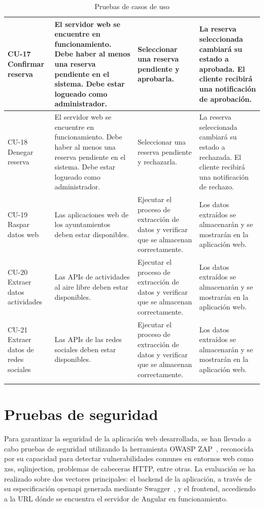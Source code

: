 \begin{longtable}{|p{2.5cm}|p{3.5cm}|p{4.5cm}|p{5cm}|}
CU-17 Confirmar reserva &
El servidor web se encuentre en funcionamiento. \newline Debe haber al menos una reserva pendiente en el sistema. Debe estar logueado como administrador. &
Seleccionar una reserva pendiente y aprobarla. &
La reserva seleccionada cambiará su estado a aprobada. \newline El cliente recibirá una notificación de aprobación. \\ \hline

CU-18 Denegar reserva &
El servidor web se encuentre en funcionamiento. \newline Debe haber al menos una reserva pendiente en el sistema. Debe estar logueado como administrador. &
Seleccionar una reserva pendiente y rechazarla. &
La reserva seleccionada cambiará su estado a rechazada. \newline El cliente recibirá una notificación de rechazo. \\ \hline

CU-19 Raspar datos web &
Las aplicaciones web de los ayuntamientos deben estar disponibles. &
Ejecutar el proceso de extracción de datos y verificar que se almacenan correctamente. &
Los datos extraídos se almacenarán y se mostrarán en la aplicación web. \\ \hline

CU-20 Extraer datos actividades &
Las APIs de actividades al aire libre deben estar disponibles. &
Ejecutar el proceso de extracción de datos y verificar que se almacenan correctamente. &
Los datos extraídos se almacenarán y se mostrarán en la aplicación web. \\ \hline

CU-21 Extraer datos de redes sociales &
Las APIs de las redes sociales deben estar disponibles. &
Ejecutar el proceso de extracción de datos y verificar que se almacenan correctamente. &
Los datos extraídos se almacenarán y se mostrarán en la aplicación web. \\ \hline


	\caption{Pruebas de casos de uso}
	\label{tbl:pruebasCU}
\end{longtable}

\section{Pruebas de seguridad}
Para garantizar la seguridad de la aplicación web desarrollada, se han llevado a cabo pruebas de seguridad utilizando la herramienta OWASP ZAP~\cite{owasp-zap:web}, reconocida por su capacidad para detectar vulnerabilidades comunes en entornos web como \gls{xss}, \gls{sqlinjection}, problemas de cabeceras HTTP, entre otras. La evaluación se ha realizado sobre dos vectores principales: el \gls{backend} de la aplicación, a través de su especificación \gls{openapi} generada mediante Swagger~\cite{swagger}, y el \gls{frontend}, accediendo a la URL dónde se encuentra el servidor de Angular en funcionamiento.

